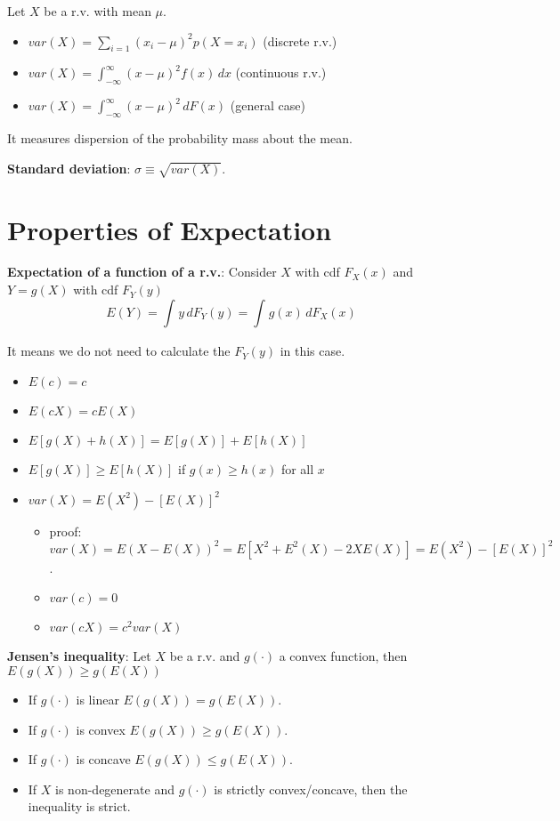 \begin{definition}[Variance]
    Let $X$ be a r.v. with mean $\mu$. \begin{itemize}
        \item $var(X) = \sum_{i=1}^{} (x_i - \mu)^{2} p(X=x_i)$ (discrete r.v.)
        \item $var(X) = \int_{-\infty }^{\infty } (x-\mu)^{2}f(x) \, dx$ (continuous r.v.)
        \item $var(X) = \int_{-\infty }^{\infty } (x-\mu)^{2} \, dF(x)$ (general case)
    \end{itemize}

    It measures dispersion of the probability mass about the mean.

    \textbf{Standard deviation}: $\sigma \equiv \sqrt{var(X)}$.
\end{definition}

\section{Properties of Expectation}

\textbf{Expectation of a function of a r.v.}: Consider $X$ with cdf $F_X(x)$ and $Y = g(X)$ with cdf $F_Y(y)$ \[
    E(Y) = \int_{}^{} y \, dF_Y(y) = \int_{}^{} g(x) \, dF_X(x)
\]
\begin{remark*}
    It means we do not need to calculate the $F_Y(y)$ in this case.
\end{remark*}

\begin{itemize}
    \item $E(c) = c$
    \item $E(cX) = cE(X)$
    \item $E[g(X) + h(X)] = E[g(X)] + E[h(X)]$
    \item $E[g(X)] \geq E[h(X)]$ if $g(x) \geq h(x)$ for all $x$
    \item $var(X) = E(X^2) - [E(X)]^{2}$ \begin{itemize}
              \item proof: $var(X) = E(X-E(X))^{2} = E[X^2 + E^2(X) - 2XE(X)] = E(X^{2}) - [E(X)]^{2}$.
              \item $var(c) = 0$
              \item $var(cX) = c ^{2} var(X)$
          \end{itemize}
\end{itemize}


\textbf{Jensen's inequality}: Let $X$ be a r.v. and $g(\cdot )$ a convex function, then $E(g(X)) \geq g(E(X))$ \begin{itemize}
    \item If $g(\cdot )$ is linear $E(g(X)) = g(E(X))$.
    \item If $g(\cdot )$ is convex $E(g(X)) \geq g(E(X))$.
    \item If $g(\cdot )$ is concave $E(g(X)) \leq g(E(X))$.
    \item If $X$ is non-degenerate and $g(\cdot )$ is strictly convex/concave, then the inequality is strict.
\end{itemize}

